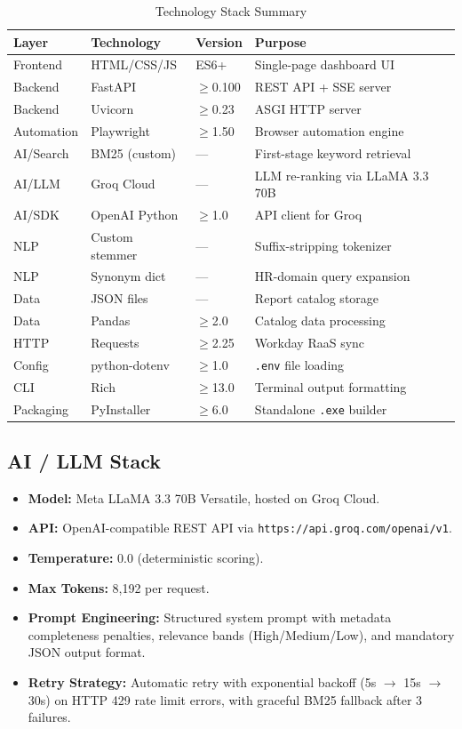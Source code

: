 \documentclass[12pt,a4paper]{article}
\begin{document}
\begin{table}[H]
\centering
\caption{Technology Stack Summary}
\label{tab:tech-stack}
\begin{tabularx}{\textwidth}{l l l X}
\toprule
\textbf{Layer} & \textbf{Technology} & \textbf{Version} & \textbf{Purpose} \\
\midrule
Frontend & HTML/CSS/JS & ES6+ & Single-page dashboard UI \\
Backend & FastAPI & $\geq$0.100 & REST API + SSE server \\
Backend & Uvicorn & $\geq$0.23 & ASGI HTTP server \\
Automation & Playwright & $\geq$1.50 & Browser automation engine \\
AI/Search & BM25 (custom) & --- & First-stage keyword retrieval \\
AI/LLM & Groq Cloud & --- & LLM re-ranking via LLaMA 3.3 70B \\
AI/SDK & OpenAI Python & $\geq$1.0 & API client for Groq \\
NLP & Custom stemmer & --- & Suffix-stripping tokenizer \\
NLP & Synonym dict & --- & HR-domain query expansion \\
Data & JSON files & --- & Report catalog storage \\
Data & Pandas & $\geq$2.0 & Catalog data processing \\
HTTP & Requests & $\geq$2.25 & Workday RaaS sync \\
Config & python-dotenv & $\geq$1.0 & \texttt{.env} file loading \\
CLI & Rich & $\geq$13.0 & Terminal output formatting \\
Packaging & PyInstaller & $\geq$6.0 & Standalone \texttt{.exe} builder \\
\bottomrule
\end{tabularx}
\end{table}

\subsection{AI / LLM Stack}
\label{subsec:ai-stack}

\begin{itemize}[leftmargin=2em]
  \item \textbf{Model:} Meta LLaMA 3.3 70B Versatile, hosted on Groq Cloud.
  \item \textbf{API:} OpenAI-compatible REST API via \texttt{https://api.groq.com/openai/v1}.
  \item \textbf{Temperature:} 0.0 (deterministic scoring).
  \item \textbf{Max Tokens:} 8,192 per request.
  \item \textbf{Prompt Engineering:} Structured system prompt with metadata completeness penalties, relevance bands (High/Medium/Low), and mandatory JSON output format.
  \item \textbf{Retry Strategy:} Automatic retry with exponential backoff (5s $\rightarrow$ 15s $\rightarrow$ 30s) on HTTP 429 rate limit errors, with graceful BM25 fallback after 3 failures.
\end{itemize}
\end{document}
